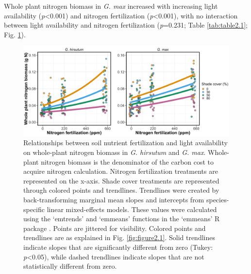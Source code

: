 Whole plant nitrogen biomass in \textit{G. max} increased with increasing light availability (\textit{p}<0.001) and nitrogen fertilization (\textit{p}<0.001), with no interaction between light availability and nitrogen fertilization (\textit{p}=0.231; Table \ref{tab:table2.1}; Fig. \ref{fig:figure2.2}).

\newpage
\begin{landscape}
\begin{figure}
    \includegraphics[width = \columnwidth]{ch2_LxN_Greenhouse/figs/fig2_nacq.jpg}
    \centering
    \caption[Relationships between soil nitrogen fertilization and light availability on whole-plant nitrogen biomass in \textit{G. hirsutum} and \textit{G. max}]{Relationships between soil nutrient fertilization and light availability on whole-plant nitrogen biomass in \textit{G. hirsutum} and \textit{G. max}. Whole-plant nitrogen biomass is the denominator of the carbon cost to acquire nitrogen calculation. Nitrogen fertilization treatments are represented on the x-axis. Shade cover treatments are represented through colored points and trendlines. Trendlines were created by back-transforming marginal mean slopes and intercepts from species-specific linear mixed-effects models. These values were calculated using the ‘emtrends’ and ‘emmeans’ functions in the ‘emmeans’ R package . Points are jittered for visibility. Colored points and trendlines are as explained in Fig. \ref{fig:figure2.1}. Solid trendlines indicate slopes that are significantly different from zero (Tukey: \textit{p}<0.05), while dashed trendlines indicate slopes that are not statistically different from zero.}
    \label{fig:figure2.2}
    \small
\end{figure}
\end{landscape}
\clearpage

\newpage
